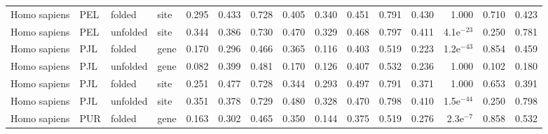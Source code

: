\begin{longtable}{llllrrrrrrrrrrr}
        Homo sapiens &                       PEL &    folded &  site &                              0.295 &                               0.433 &                 0.728 &                 0.405 &                              0.340 &                               0.451 &                 0.791 &                 0.430 &         1.000 &  0.710 &  0.423 \\
        Homo sapiens &                       PEL &  unfolded &  site &                              0.344 &                               0.386 &                 0.730 &                 0.470 &                              0.329 &                               0.468 &                 0.797 &                 0.411 &  4.1e$^{-23}$ &  0.250 &  0.781 \\
        Homo sapiens &                       PJL &    folded &  gene &                              0.170 &                               0.296 &                 0.466 &                 0.365 &                              0.116 &                               0.403 &                 0.519 &                 0.223 &  1.2e$^{-43}$ &  0.854 &  0.459 \\
        Homo sapiens &                       PJL &  unfolded &  gene &                              0.082 &                               0.399 &                 0.481 &                 0.170 &                              0.126 &                               0.407 &                 0.532 &                 0.236 &         1.000 &  0.102 &  0.180 \\
        Homo sapiens &                       PJL &    folded &  site &                              0.251 &                               0.477 &                 0.728 &                 0.344 &                              0.293 &                               0.497 &                 0.791 &                 0.371 &         1.000 &  0.653 &  0.391 \\
        Homo sapiens &                       PJL &  unfolded &  site &                              0.351 &                               0.378 &                 0.729 &                 0.480 &                              0.328 &                               0.470 &                 0.798 &                 0.410 &  1.5e$^{-44}$ &  0.250 &  0.798 \\
        Homo sapiens &                       PUR &    folded &  gene &                              0.163 &                               0.302 &                 0.465 &                 0.350 &                              0.144 &                               0.375 &                 0.519 &                 0.276 &   2.3e$^{-7}$ &  0.858 &  0.532 \\

\end{longtable}
